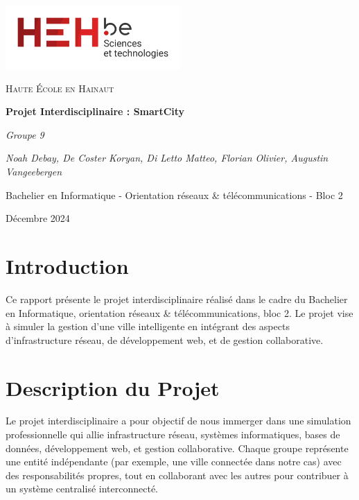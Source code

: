 \documentclass[a4paper,12pt]{report}
\begin{document}
\begin{titlepage}
    \centering
    \includegraphics[width=0.5\textwidth]{logo_heh.png}\par\vspace{1cm}
    {\scshape\LARGE Haute École en Hainaut \par}
    \vspace{1cm}
    {\huge\bfseries Projet Interdisciplinaire : SmartCity \par}
    \vspace{2cm}
    {\Large\itshape Groupe 9 \par}
    \vspace{1cm}
    {\Large\itshape Noah Debay, De Coster Koryan, Di Letto Matteo, Florian Olivier, Augustin Vangeebergen \par}
    \vfill
    {\large Bachelier en Informatique - Orientation réseaux \& télécommunications - Bloc 2 \par}
    \vfill
    {\large Décembre 2024 \par}
\end{titlepage}

\tableofcontents
\newpage

\chapter{Introduction}
Ce rapport présente le projet interdisciplinaire réalisé dans le cadre du Bachelier en Informatique, orientation réseaux \& télécommunications, bloc 2. Le projet vise à simuler la gestion d'une ville intelligente en intégrant des aspects d'infrastructure réseau, de développement web, et de gestion collaborative.

\chapter{Description du Projet}
Le projet interdisciplinaire a pour objectif de nous immerger dans une simulation professionnelle qui allie infrastructure réseau, systèmes informatiques, bases de données, développement web, et gestion collaborative. Chaque groupe représente une entité indépendante (par exemple, une ville connectée dans notre cas) avec des responsabilités propres, tout en collaborant avec les autres pour contribuer à un système centralisé interconnecté.
\end{document}
